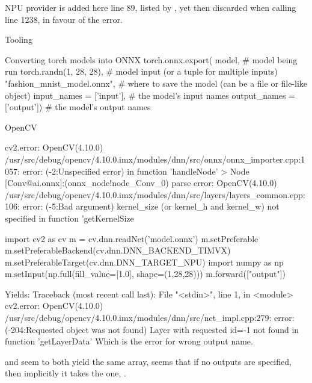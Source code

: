 NPU provider is added here line 89,
listed by ,
yet then discarded when calling  line 1238,
in favour of the  error.

\secc Tooling


\secc Converting torch models into ONNX
\begtt{}
torch.onnx.export(
model,                                # model being run
torch.randn(1, 28, 28),    # model input (or a tuple for multiple inputs)
"fashion_mnist_model.onnx",           # where to save the model (can be a file or file-like object)
input_names = ['input'],              # the model's input names
output_names = ['output'])            # the model's output names
\endtt

\sec OpenCV

\begtt
cv2.error: OpenCV(4.10.0) /usr/src/debug/opencv/4.10.0.imx/modules/dnn/src/onnx/onnx_importer.cpp:1057: error: (-2:Unspecified error) in function 'handleNode'
> Node [Conv@ai.onnx]:(onnx_node!node_Conv_0) parse error: OpenCV(4.10.0) /usr/src/debug/opencv/4.10.0.imx/modules/dnn/src/layers/layers_common.cpp:106: error: (-5:Bad argument) kernel_size (or kernel_h and kernel_w) not specified in function 'getKernelSize
\endtt

\begtt{}
import cv2 as cv
m = cv.dnn.readNet('model.onnx')
m.setPreferable
m.setPreferableBackend(cv.dnn.DNN_BACKEND_TIMVX)
m.setPreferableTarget(cv.dnn.DNN_TARGET_NPU)
import numpy as np
m.setInput(np.full(fill_value=[1.0], shape=(1,28,28)))
m.forward(["output"])
\endtt

Yields:
\begtt
Traceback (most recent call last):
  File "<stdin>", line 1, in <module>
cv2.error: OpenCV(4.10.0) /usr/src/debug/opencv/4.10.0.imx/modules/dnn/src/net_impl.cpp:279: error: (-204:Requested object was not found) Layer with requested id=-1 not found in function 'getLayerData'
\endtt
Which is the error for wrong output name.

 and 
seem to both yield the same array,
seems that if no outputs are specified,
then implicitly it takes the one, .


